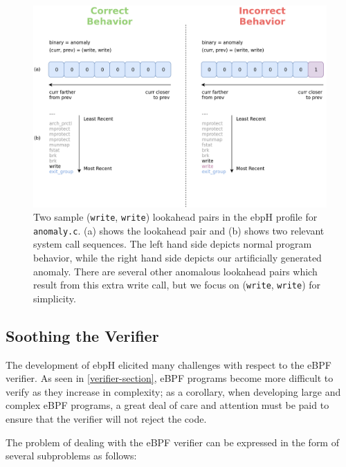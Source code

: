 \documentclass[
  12pt]{findlay}
\begin{document}
\begin{figure}
\includegraphics[height=0.4\textheight]{../figures/lookahead-anomaly.png}
\caption[Two sample (\lstinline{write}, \lstinline{write}) lookahead pairs in the ebpH profile for \texttt{anomaly.c}]{
    Two sample (\lstinline{write}, \lstinline{write}) lookahead pairs in the ebpH profile for \texttt{anomaly.c}.
    (a) shows the lookahead pair and (b) shows two relevant system call sequences. The left hand side depicts normal program
    behavior, while the right hand side depicts our artificially generated anomaly.
    There are several other anomalous lookahead pairs which result from this extra write call, but we focus
    on (\lstinline{write}, \lstinline{write}) for simplicity.
}
\label{anomaly-lookahead-comp}
\end{figure}

\FloatBarrier

\hypertarget{soothing-the-verifier}{%
\subsection{Soothing the Verifier}\label{soothing-the-verifier}}

The development of ebpH elicited many challenges with respect to the
eBPF verifier. As seen in \autoref{verifier-section}, eBPF programs
become more difficult to verify as they increase in complexity; as a
corollary, when developing large and complex eBPF programs, a great deal
of care and attention must be paid to ensure that the verifier will not
reject the code.

The problem of dealing with the eBPF verifier can be expressed in the
form of several subproblems as follows:
\end{document}
